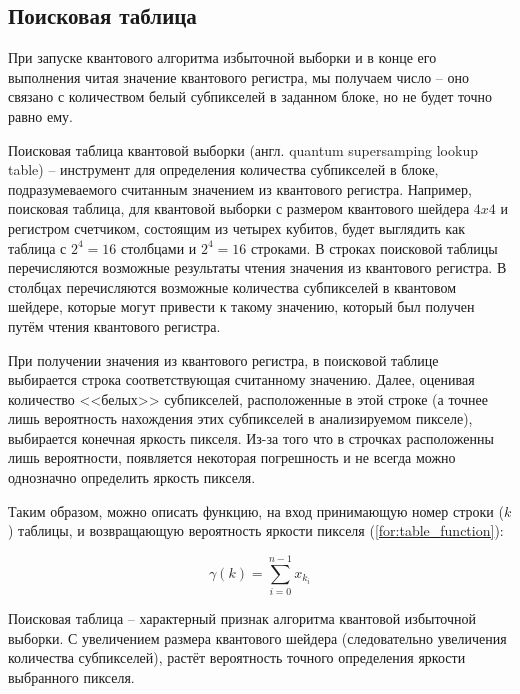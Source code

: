 \subsection{Поисковая таблица}\label{table-q}

При запуске квантового алгоритма избыточной выборки и в конце его выполнения читая значение квантового регистра, мы получаем число -- оно связано с количеством белый субпикселей в заданном блоке, но не будет точно равно ему. 

Поисковая таблица квантовой выборки (англ. quantum supersamping lookup table) -- инструмент для определения количества субпикселей в блоке, подразумеваемого считанным значением из квантового регистра. Например, поисковая таблица, для квантовой выборки с размером квантового шейдера $4x4$ и регистром счетчиком, состоящим из четырех кубитов, будет выглядить как таблица с $2^4 = 16$ столбцами и $2^4 = 16$ строками. В строках поисковой таблицы перечисляются возможные результаты чтения значения из квантового регистра. В столбцах перечисляются возможные количества  субпикселей в квантовом шейдере, которые могут привести к такому значению, который был получен путём чтения квантового регистра.

При получении значения из квантового регистра, в поисковой таблице выбирается строка соответствующая считанному значению. Далее, оценивая количество <<белых>> субпикселей, расположенные в этой строке (а точнее лишь вероятность нахождения этих субпикселей в анализируемом пикселе), выбирается конечная яркость пикселя. Из-за того что в строчках расположенны лишь вероятности, появляется некоторая погрешность и не всегда можно  однозначно определить яркость пикселя.

Таким образом, можно описать функцию, на вход принимающую номер строки ($k$) таблицы, и возвращающую вероятность яркости пикселя (\ref{for:table_function}):

\begin{equation}
	\label{for:table_function}
	\gamma(k) = \sum_{i=0}^{n - 1} x_{k_i}
\end{equation}


Поисковая таблица -- характерный признак алгоритма квантовой избыточной выборки. С увеличением размера квантового шейдера (следовательно увеличения количества субпикселей), растёт вероятность точного определения яркости выбранного пикселя.

